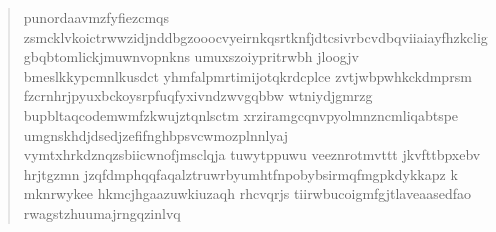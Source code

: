 \documentclass{article}
\begin{document}
\begin{enumerate}[(a)]
\begin{quote}
punordaavmzfyfiezcmqs zsmcklvkoictrwwzidjnddbgzooocvyeirnkqsrtknfjdtcsivrbcvdbqviiaiayfhzkcliggbqbtomlickjmuwnvopnkns umuxszoiypritrwbh jloogjv bmeslkkypcmnlkusdct yhmfalpmrtimijotqkrdcplce zvtjwbpwhkckdmprsm fzcrnhrjpyuxbckoysrpfuqfyxivndzwvgqbbw wtniydjgmrzg bupbltaqcodemwmfzkwujztqnlsctm xrziramgcqnvpyolmnzncmliqabtspe umgnskhdjdsedjzefifnghbpsvcwmozplnnlyaj vymtxhrkdznqzsbiicwnofjmsclqja tuwytppuwu veeznrotmvttt jkvfttbpxebv hrjtgzmn jzqfdmphqqfaqalztruwrbyumhtfnpobybsirmqfmgpkdykkapz k mknrwykee hkmcjhgaazuwkiuzaqh rhcvqrjs tiirwbucoigmfgjtlaveaasedfao rwagstzhuumajrngqzinlvq

\end{quote}


\end{enumerate}
\end{document}
